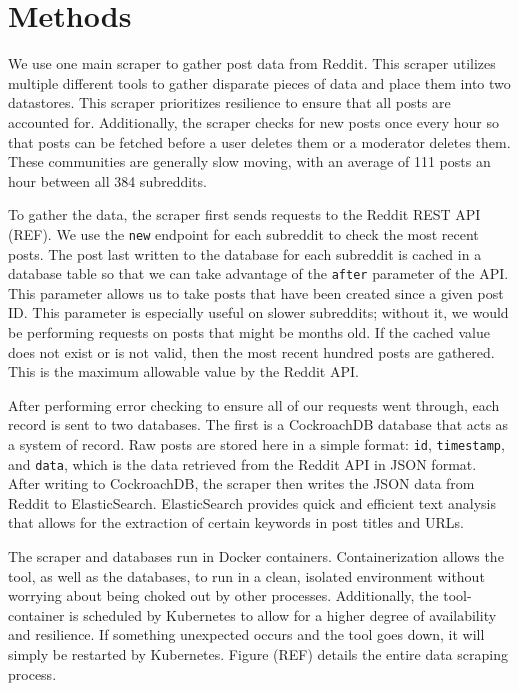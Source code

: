 \documentclass[12pt,oneside, letterpaper]{book}
\begin{document}
\section{Methods}
\par We use one main scraper to gather post data from Reddit. This scraper utilizes multiple different tools to gather disparate pieces of data and place them into two datastores. This scraper prioritizes resilience to ensure that all posts are accounted for. Additionally, the scraper checks for new posts once every hour so that posts can be fetched before a user deletes them or a moderator deletes them. These communities are generally slow moving, with an average of 111 posts an hour between all 384 subreddits.

\par To gather the data, the scraper first sends requests to the Reddit REST API (REF). We use the \texttt{new} endpoint for each subreddit to check the most recent posts. The post last written to the database for each subreddit is cached in a database table so that we can take advantage of the \texttt{after} parameter of the API. This parameter allows us to take posts that have been created since a given post ID. This parameter is especially useful on slower subreddits; without it, we would be performing requests on posts that might be months old. If the cached value does not exist or is not valid, then the most recent hundred posts are gathered. This is the maximum allowable value by the Reddit API.

\par After performing error checking to ensure all of our requests went through, each record is sent to two databases. The first is a CockroachDB database that acts as a system of record. Raw posts are stored here in a simple format: \texttt{id}, \texttt{timestamp}, and \texttt{data}, which is the data retrieved from the Reddit API in JSON format. After writing to CockroachDB, the scraper then writes the JSON data from Reddit to ElasticSearch. ElasticSearch provides quick and efficient text analysis that allows for the extraction of certain keywords in post titles and URLs.

\par The scraper and databases run in Docker containers. Containerization allows the tool, as well as the databases, to run in a clean, isolated environment without worrying about being choked out by other processes. Additionally, the tool-container is scheduled by Kubernetes to allow for a higher degree of availability and resilience. If something unexpected occurs and the tool goes down, it will simply be restarted by Kubernetes. Figure (REF) details the entire data scraping process.
\end{document}

